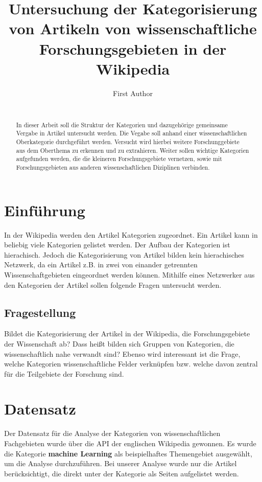 \documentclass{acm_proc_article-sp}
\begin{document}
\title{Untersuchung der Kategorisierung von Artikeln von wissenschaftliche Forschungsgebieten in der Wikipedia}

\author{
\alignauthor
	First Author\\
	\\
}

\maketitle
\begin{abstract}
In dieser Arbeit soll die Struktur der Kategorien und dazugehörige gemeinsame Vergabe in Artikel untersucht werden. Die Vegabe soll anhand einer wissenschaftlichen Oberkategorie durchgeführt werden. Versucht wird hierbei weitere Forschunggebiete aus dem Oberthema zu erkennen und zu extrahieren. Weiter sollen wichtige Kategorien aufgefunden werden, die die kleineren Forschungsgebiete vernetzen, sowie mit Forschungsgebieten aus anderen wissenschaftlichen Diziplinen verbinden.
\end{abstract}

\section{Einführung}
In der Wikipedia werden den Artikel Kategorien zugeordnet. Ein Artikel kann in beliebig viele Kategorien gelistet werden. Der Aufbau der Kategorien ist hierachisch. Jedoch die Kategorisierung von Artikel bilden kein hierachisches Netzwerk, da ein Artikel z.B. in zwei von einander getrennten Wissenschaftgebieten eingeordnet werden können. Mithilfe eines Netzwerker aus den Kategorien der Artikel sollen folgende Fragen untersucht werden. 

\subsection{Fragestellung}
Bildet die Kategorisierung der Artikel in der Wikipedia, die Forschungsgebiete der Wissenschaft ab? Dass heißt bilden sich Gruppen von Kategorien, die wissenschaftlich nahe verwandt sind? Ebenso wird interessant ist die Frage, welche Kategorien wissenschaftliche Felder verknüpfen bzw. welche davon zentral für die Teilgebiete der Forschung sind.

\section{Datensatz}
Der Datensatz für die Analyse der Kategorien von wissenschaftlichen Fachgebieten wurde über die API der englischen Wikipedia gewonnen. Es wurde die Kategorie \textbf{machine Learning} als beispielhaftes Themengebiet ausgewählt, um die Analyse durchzuführen. Bei unserer Analyse wurde nur die Artikel berücksichtigt, die direkt unter der Kategorie als Seiten aufgelistet werden.
\end{document}
